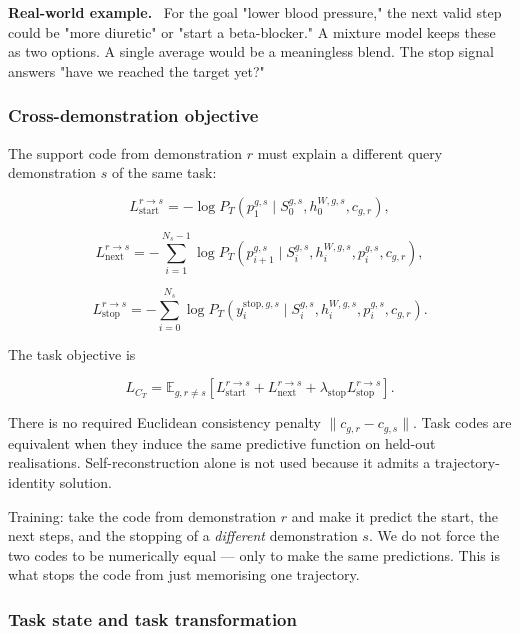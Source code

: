 \documentclass[11pt]{article}
\newenvironment{plainword}{%
  \par\medskip\noindent\begin{minipage}{\textwidth}%
  \color{gray!75!black}\small\itshape
}{%
  \end{minipage}\par\medskip}
\newenvironment{example}{%
  \par\smallskip\noindent\begin{minipage}{\textwidth}%
  \color{teal!60!black}\small
  \textbf{\color{teal!70!black}Real-world example.}\
}{%
  \end{minipage}\par\smallskip}
\begin{document}
\begin{example}
For the goal "lower blood pressure," the next valid step could be "more diuretic" or "start a beta-blocker." A mixture model keeps
these as two options. A single average would be a meaningless blend. The stop signal answers "have we reached the target yet?"
\end{example}

\subsubsection*{Cross-demonstration objective}

The support code from demonstration $r$ must explain a different query demonstration $s$ of the same task:

\[
\boxed{
L_{\mathrm{start}}^{r\rightarrow s}=
-\log P_T(p_1^{g,s}\mid
S_0^{g,s},h_0^{W,g,s},c_{g,r}),}
\]

\[
\boxed{
L_{\mathrm{next}}^{r\rightarrow s}=
-\sum_{i=1}^{N_s-1}
\log P_T(p_{i+1}^{g,s}\mid
S_i^{g,s},h_i^{W,g,s},p_i^{g,s},c_{g,r}),}
\]

\[
\boxed{
L_{\mathrm{stop}}^{r\rightarrow s}=
-\sum_{i=0}^{N_s}
\log P_T(y_i^{\mathrm{stop},g,s}\mid
S_i^{g,s},h_i^{W,g,s},p_i^{g,s},c_{g,r}).}
\]

The task objective is

\[
\boxed{
L_{C_T}=\mathbb E_{g,r\neq s}
\left[
L_{\mathrm{start}}^{r\rightarrow s}
+L_{\mathrm{next}}^{r\rightarrow s}
+\lambda_{\mathrm{stop}}L_{\mathrm{stop}}^{r\rightarrow s}
\right].}
\]

There is no required Euclidean consistency penalty $\|c_{g,r}-c_{g,s}\|$. Task codes are equivalent when they induce the same
predictive function on held-out realisations. Self-reconstruction alone is not used because it admits a trajectory-identity solution.

\begin{plainword}
Training: take the code from demonstration $r$ and make it predict the start, the next steps, and the stopping of a \emph{different}
demonstration $s$. We do not force the two codes to be numerically equal --- only to make the same predictions. This is what stops
the code from just memorising one trajectory.
\end{plainword}

\subsubsection*{Task state and task transformation}
\end{document}
